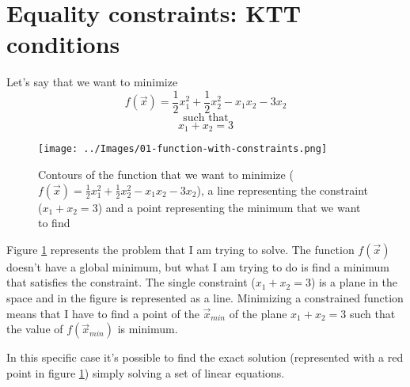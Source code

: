 \section{Equality constraints: KTT conditions}
    Let's say that we want to minimize
    \[f(\vec{x}) = \frac{1}{2}x_1^2 + \frac{1}{2}x_2^2 - x_1x_2 - 3x_2\]
    \[\text{ such that }\]
    \[x_1+x_2=3\]
    \begin{figure}
        \centering
        \texttt{[image: ../Images/01-function-with-constraints.png]}
        \caption{Contours of the function that we want to minimize (\(f(\vec{x}) = \frac{1}{2}x_1^2 + \frac{1}{2}x_2^2 - x_1x_2 - 3x_2\)), a line representing the constraint (\(x_1+x_2=3\)) and a point representing the minimum that we want to find}
        \label{function-with-constraints}
    \end{figure}
    Figure \ref{function-with-constraints} represents the problem that I am trying to solve. The function \(f(\vec{x})\) doesn't have a global minimum, but what I am trying to do is find a minimum that satisfies the constraint. The single constraint (\(x_1+x_2=3\)) is a plane in the space and in the figure is represented as a line. Minimizing a constrained function means that I have to find a point of the \(\vec{x}_{min}\) of the plane \(x_1+x_2=3\) such that the value of \(f(\vec{x}_{min})\) is minimum.\par
    In this specific case it's possible to find the exact solution (represented with a red point in figure \ref{function-with-constraints}) simply solving a set of linear equations.